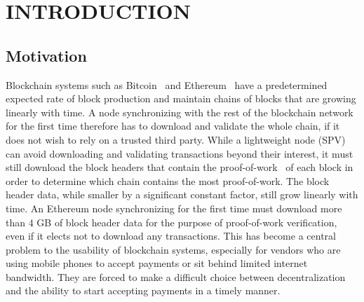 \chapter{INTRODUCTION}



\section{Motivation}
Blockchain systems such as Bitcoin~\cite{nakamoto} and
Ethereum~\cite{buterin,wood} have a predetermined expected rate of block
production and maintain chains of blocks that are growing linearly
with time. A node synchronizing with the rest of the blockchain
network for the first time therefore has to download and validate the whole
chain, if it does not wish to rely on a trusted third party. While a lightweight
node (SPV) can avoid downloading and validating transactions beyond their
interest, it must still download the block headers that contain the
proof-of-work~\cite{pow} of each block in order to determine which chain contains
the most proof-of-work. The block header data, while smaller by a significant constant
factor, still grow linearly with time. An Ethereum node synchronizing for the
first time must download more than $4$ GB of block header data for the purpose
of proof-of-work verification, even if it elects not to download any
transactions. This has become a central problem to the usability of blockchain
systems, especially for vendors who are using mobile phones to accept payments
or sit behind limited internet bandwidth. They are forced to make a difficult
choice between decentralization and the ability to start accepting payments in a
timely manner.

